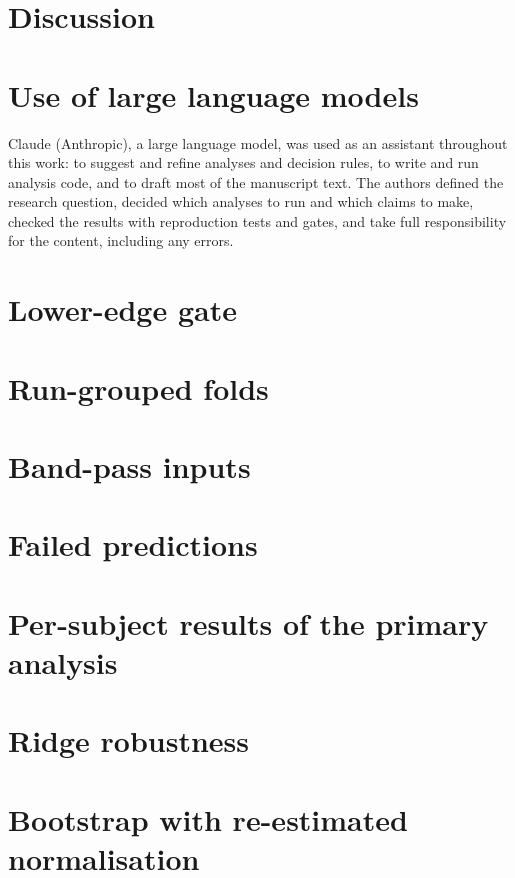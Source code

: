 \documentclass[10pt]{article}
\begin{document}
\FloatBarrier
\section{Discussion}


\section*{Use of large language models}
Claude (Anthropic), a large language model, was used as an assistant throughout this work: to suggest and refine analyses and decision rules, to write and run analysis code, and to draft most of the manuscript text. The authors defined the research question, decided which analyses to run and which claims to make, checked the results with reproduction tests and gates, and take full responsibility for the content, including any errors.




\appendix
\section{Lower-edge gate}
\label{app:lowedge}

\section{Run-grouped folds}
\label{app:runfolds}

\section{Band-pass inputs}
\label{app:bandpass}

\section{Failed predictions}
\label{app:failed}

\section{Per-subject results of the primary analysis}
\label{app:persubject}

\section{Ridge robustness}
\label{app:ridgerobust}

\section{Bootstrap with re-estimated normalisation}
\label{app:bootnorm}

\end{document}
